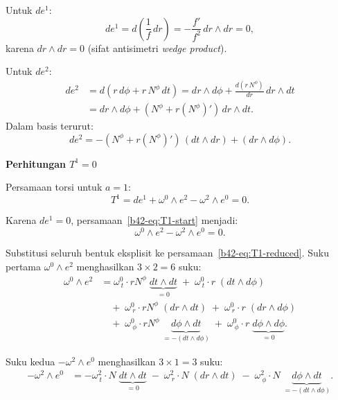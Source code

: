 \noindent Untuk $de^1$:
\begin{equation}
    de^1 = d\!\left(\frac{1}{f}\,dr\right) = -\frac{f'}{f^2}\,dr \wedge dr = 0, \label{b42-eq:de1}
\end{equation}
karena $dr \wedge dr = 0$ (sifat antisimetri \emph{wedge product}).
 
\noindent Untuk $de^2$:
\begin{align}
    de^2 &= d\!\left(r\,d\phi + r\,N^\phi\,dt\right) = dr \wedge d\phi + \frac{d(r\,N^\phi)}{dr}\,dr \wedge dt \nonumber\\[4pt]
    &= dr \wedge d\phi + (N^\phi + r(N^\phi)')\,dr \wedge dt. \label{b42-eq:de2}
\end{align}
Dalam basis terurut:
\begin{equation}
    de^2 = -(N^\phi + r(N^\phi)')\,(dt \wedge dr) + (dr \wedge d\phi). \label{b42-eq:de2-ordered}
\end{equation}
 
\vspace{0.5em}
\noindent \textbf{Perhitungan $T^1 = 0$}

Persamaan torsi untuk $a = 1$:
\begin{equation}
    T^1 = de^1 + \omega^0 \wedge e^2 - \omega^2 \wedge e^0 = 0. \label{b42-eq:T1-start}
\end{equation}
 
Karena $de^1 = 0$, persamaan~\eqref{b42-eq:T1-start} menjadi:
\begin{equation}
    \omega^0 \wedge e^2 - \omega^2 \wedge e^0 = 0. \label{b42-eq:T1-reduced}
\end{equation}
 
Substitusi seluruh bentuk eksplisit ke persamaan~\eqref{b42-eq:T1-reduced}. Suku pertama $\omega^0 \wedge e^2$ menghasilkan $3 \times 2 = 6$ suku:
\begin{align}
    \omega^0 \wedge e^2 &= \omega^0_{\ t}\cdot rN^\phi\;\underbrace{dt \wedge dt}_{= 0} \;+\; \omega^0_{\ t}\cdot r\;(dt \wedge d\phi) \nonumber\\[4pt]
    &\quad +\; \omega^0_{\ r}\cdot rN^\phi\;(dr \wedge dt) \;+\; \omega^0_{\ r}\cdot r\;(dr \wedge d\phi) \nonumber\\[4pt]
    &\quad +\; \omega^0_{\ \phi}\cdot rN^\phi\;\underbrace{d\phi \wedge dt}_{= -(dt \wedge d\phi)} \;+\; \omega^0_{\ \phi}\cdot r\;\underbrace{d\phi \wedge d\phi}_{= 0}. \label{b42-eq:T1-prod1}
\end{align}
 
Suku kedua $-\omega^2 \wedge e^0$ menghasilkan $3 \times 1 = 3$ suku:
\begin{align}
    -\omega^2 \wedge e^0 &= -\omega^2_{\ t}\cdot N\;\underbrace{dt \wedge dt}_{= 0} \;-\; \omega^2_{\ r}\cdot N\;(dr \wedge dt) \;-\; \omega^2_{\ \phi}\cdot N\;\underbrace{d\phi \wedge dt}_{= -(dt \wedge d\phi)}. \label{b42-eq:T1-prod2}
\end{align}
 
